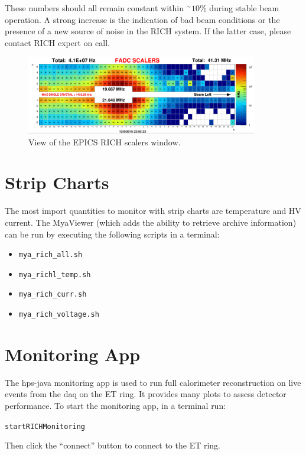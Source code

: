 \documentclass[12pt]{article}
\begin{document}
      These numbers should all remain constant within $^\sim10\%$ during stable beam operation. A strong increase is the indication of bad beam conditions or the presence of a new source of noise in the RICH system.  If the latter case, please contact RICH expert on call.
\begin{figure}[htbp]
\center
\includegraphics[width=0.9\textwidth]{pics/fadcscalers_2015run.png}
\caption{ \label{Scalers} View of the EPICS RICH scalers window.}
\end{figure}
{\color{blue}
\newpage
  \section{Strip Charts}
  }
      The most import quantities to monitor with strip charts are temperature and HV current.  
  The MyaViewer (which adds the ability to retrieve archive information) can be run by executing the following scripts in a terminal:
      
      \begin{itemize}
          \item \texttt{mya\_rich\_all.sh}
          \item \texttt{mya\_richl\_temp.sh}
          \item \texttt{mya\_rich\_curr.sh}
          \item \texttt{mya\_rich\_voltage.sh}
      \end{itemize}
{\color{blue}
\section{Monitoring App}
}
The hps-java monitoring app is used to run full calorimeter reconstruction on live events from the daq on the ET ring.  It provides many plots to assess detector performance.  To start the monitoring app, in a terminal run:
\begin{center}\texttt{startRICHMonitoring}\end{center}
Then click the ``connect'' button to connect to the ET ring.
\end{document}
